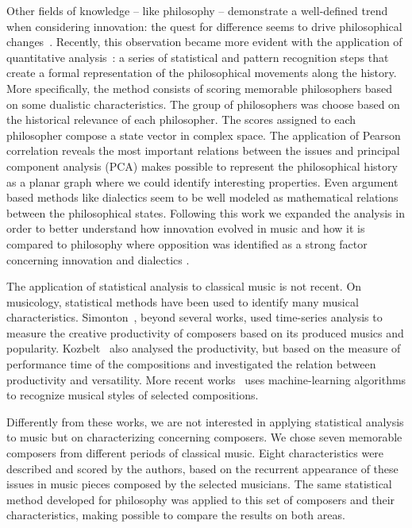 \documentclass[
 aip,
 jmp,
 amsmath,amssymb,
 reprint,
]{revtex4-1}
\begin{document}
Other fields of knowledge -- like philosophy -- demonstrate
a well-defined trend when considering innovation: the
quest for difference seems to drive philosophical
changes~\cite{Deleuze}. Recently, this observation became more evident with
the application of quantitative analysis~\cite{Fabbri}: a series of statistical
and pattern recognition steps that create a formal representation of
the philosophical movements along the history. More specifically, the method consists of
scoring memorable philosophers based on some dualistic
characteristics. The group of philosophers was choose
based on the historical relevance of each philosopher. The
scores assigned to each philosopher compose a state
vector in complex space. The application
of Pearson correlation reveals the most important relations between
the issues and principal component analysis (PCA) makes possible to
represent the philosophical history as a planar graph where we could
identify interesting properties. Even argument based methods like dialectics
seem to be well modeled as mathematical relations between the
philosophical states. Following this work we
expanded the analysis in order to better understand how
innovation evolved in music and how it is compared to
philosophy where opposition was identified as a strong factor
concerning innovation and dialectics .

The application of statistical analysis to classical
music is not recent. On musicology, statistical methods have been used
to identify many musical characteristics.
Simonton~\cite{Simonton1991829, Simonton1977791}, beyond several
works, used time-series analysis to measure the creative productivity
of composers based on its produced musics and popularity. Kozbelt~\cite{Kozbelt01012009, Kozbelt01012007} also
analysed the productivity, but based on the measure of performance
time of the compositions and investigated the relation between
productivity and versatility. More recent works~\cite{Kranenburg2004, Kranenburg2007} uses machine-learning
algorithms to recognize musical styles of selected compositions.

Differently from these works, we are not interested in applying
statistical analysis to music but on characterizing concerning composers.
We chose seven memorable composers from different periods of classical music.
Eight characteristics were described and scored by the authors, based
on the recurrent appearance of these issues in music pieces composed
by the selected musicians. The same statistical method developed for
philosophy was applied to this set of composers and their
characteristics, making possible to compare the results on both areas.
\end{document}
